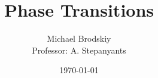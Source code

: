 


\title{Phase Transitions}
\date{\today}
\author{Michael Brodskiy\\ \small Professor: A. Stepanyants}



\maketitle

